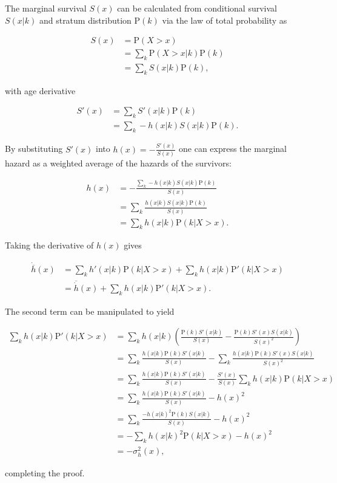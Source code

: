 \documentclass[10pt,twoside,reqno]{article}
\begin{document}
  The marginal survival \(S(x)\) can be calculated from conditional survival \(S(x|k)\) and stratum distribution \(\mathrm{P}(k)\) via the law of total probability as

  \[
  \begin{aligned}
  S(x) &= \mathrm{P}(X>x) \\
  &= \sum_k \mathrm{P}(X>x|k)\mathrm{P}(k) \\
  &= \sum_kS(x|k)\mathrm{P}(k),
  \end{aligned}
  \]

  with age derivative

  \[
  \begin{aligned}
    S'(x) &= \sum_k S'(x|k)\mathrm{P}(k) \\
          &= \sum_k -h(x|k)S(x|k)\mathrm{P}(k).
  \end{aligned}
  \]

  By substituting \(S'(x)\) into \(h(x)=-\frac{S'(x)}{S(x)}\) one can express the marginal hazard as a weighted average of the hazards of the survivors:

  \[
  \begin{aligned}
    h(x) &= -\frac{\sum_k -h(x|k)S(x|k)\mathrm{P}(k)} {S(x)} \\
         &= \sum_k \frac{h(x|k)S(x|k)\mathrm{P}(k)} {S(x)} \\
         &= \sum_k h(x|k)\mathrm{P}(k|X>x).
  \end{aligned}
  \]

  Taking the derivative of \(h(x)\) gives

  \[
  \begin{aligned}
  \dot{\overline{h}}(x) &=
  \sum_k h'(x|k)\mathrm{P}(k|X>x) + \sum_k h(x|k)\mathrm{P}'(k|X>x) \\
      &= \overline{\dot{h}}(x) +
      \sum_k h(x|k)\mathrm{P}'(k|X>x).
  \end{aligned}
  \]

  The second term can be manipulated to yield

  \[
  \begin{aligned}
    \sum_k h(x|k)\mathrm{P}'(k|X>x) &=
    \sum_k h(x|k) \left(
        \frac {\mathrm{P}(k)S'(x|k)} {S(x)} -
        \frac {\mathrm{P}(k)S'(x)S(x|k)} {S(x)^2}
      \right) \\
    &=
    \sum_k \frac {h(x|k)\mathrm{P}(k)S'(x|k)} {S(x)} -
    \sum_k \frac {h(x|k)\mathrm{P}(k)S'(x)S(x|k)} {S(x)^2}  \\
    &=
    \sum_k \frac {h(x|k) \mathrm{P}(k)S'(x|k)} {S(x)} -
    \frac {S'(x)} {S(x)} \sum_k h(x|k) \mathrm{P}(k|X>x) \\
    &=
    \sum_k \frac {h(x|k) \mathrm{P}(k)S'(x|k)} {S(x)} - h(x)^2 \\
    &=
    \sum_k \frac {-h(x|k)^2 \mathrm{P}(k)S(x|k)} {S(x)} - h(x)^2 \\
    &=
    -\sum_k h(x|k)^2 \mathrm{P}(k|X>x) - h(x)^2 \\
    &= 
    -\sigma^2_h(x),
  \end{aligned}
  \]

  completing the proof.



\cleardoublepage
\end{document}
